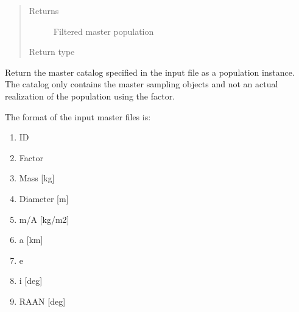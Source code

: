 \documentclass[letterpaper,10pt,english]{sphinxmanual}
\begin{document}
\begin{fulllineitems}
\begin{quote}
\begin{description}
\begin{itemize}
\end{itemize}

\item[{Returns}] \leavevmode
Filtered master population

\item[{Return type}] \leavevmode
{\hyperref[\detokenize{modules/population:population.Population}]{}}

\end{description}\end{quote}

\end{fulllineitems}


\begin{fulllineitems}
\label{\detokenize{modules/population_library:population_library.master_catalog}}
Return the master catalog specified in the input file as a population instance. The catalog only contains the master sampling objects and not an actual realization of the population using the factor.

The format of the input master files is:
\begin{enumerate}
\def\theenumi{\arabic{enumi}}
\def\labelenumi{\theenumi .}
\makeatletter\def\p@enumii{\p@enumi \theenumi .}\makeatother
\setcounter{enumi}{-1}
\item {} 
ID

\item {} 
Factor

\item {} 
Mass {[}kg{]}

\item {} 
Diameter {[}m{]}

\item {} 
m/A {[}kg/m2{]}

\item {} 
a {[}km{]}

\item {} 
e

\item {} 
i {[}deg{]}

\item {} 
RAAN {[}deg{]}


\end{enumerate}
\end{fulllineitems}
\end{document}
